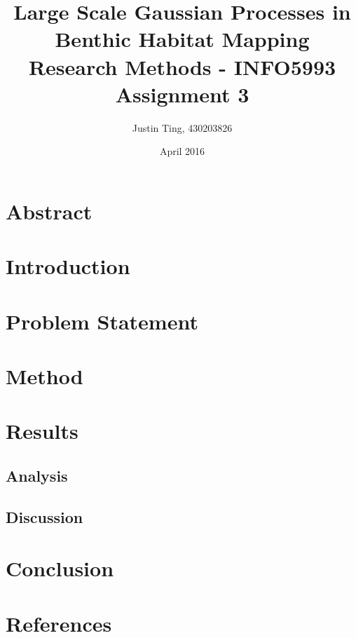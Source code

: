 \documentclass[12pt]{article}
\title{Large Scale Gaussian Processes in Benthic Habitat Mapping \\ Research Methods - INFO5993 Assignment 3}
\author{Justin Ting, 430203826}
\date{April 2016}
\begin{document}
\maketitle

\section{Abstract}

\section{Introduction}

\section{Problem Statement}

\section{Method}

\section{Results}
\subsection{Analysis}
\subsection{Discussion}

\section{Conclusion}

\section{References}

\newpage




\end{document}
